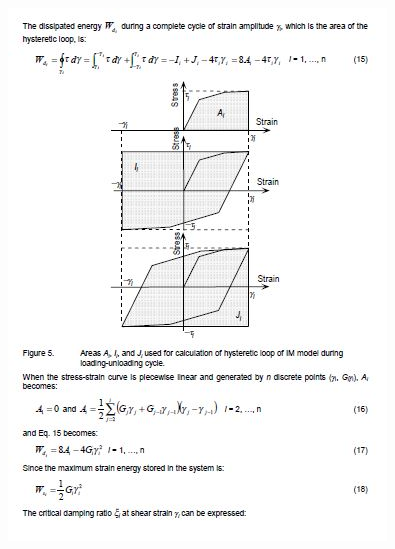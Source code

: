 \documentclass[11pt,a4paper]{report}
\begin{document}
\begin{figure}[h!]
	\centering
	\includegraphics[width=1\linewidth]{"NERA 4"}
	\label{Nera4}
\end{figure}
\end{document}

